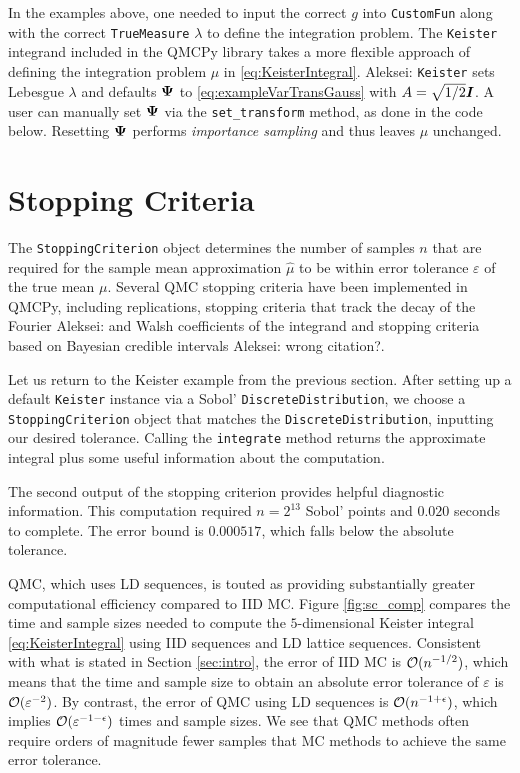 \documentclass[graybox,footinfo]{svmult}
\newcommand{\AGSComment}[1]{{\color{cyan} Aleksei: #1}}
\begin{document}
In the examples above, one needed to input the correct $g$ into \texttt{CustomFun} along with the correct \texttt{TrueMeasure} $\lambda$ to define the integration problem. The \texttt{Keister} integrand included in the QMCPy library takes a more flexible approach of defining the integration problem $\mu$ in \eqref{eq:KeisterIntegral}.
\AGSComment{\texttt{Keister} sets Lebesgue $\lambda$ and defaults ${\boldsymbol{\Psi}}$ to \eqref{eq:exampleVarTransGauss} with $A=\sqrt{1/2}{\boldsymbol{I}}$. A user can manually set ${\boldsymbol{\Psi}}$ via the \texttt{set\_transform} method, as done in the code below. Resetting ${\boldsymbol{\Psi}}$ performs  \emph{importance sampling} and thus leaves $\mu$ unchanged.}  


\section{Stopping Criteria} \label{sec:stopping_crit}

The \texttt{StoppingCriterion} object determines the number of samples $n$ that are required for the sample mean approximation $\hat{\mu}$ to be within error tolerance $\varepsilon$ of the true mean $\mu$.  Several QMC stopping criteria have been implemented in QMCPy, including replications, stopping criteria that track the decay of the Fourier \AGSComment{and Walsh} coefficients of the integrand \cite{HicJim16a,HicEtal17a,JimHic16a} and stopping criteria based on Bayesian credible intervals \cite{RatHic19a,JagHic22a} \AGSComment{wrong citation?}.

Let us return to the Keister example from the previous section.  After setting up  a default \texttt{Keister} instance via a Sobol' \texttt{DiscreteDistribution}, we choose a \texttt{StoppingCriterion} object that matches the \texttt{DiscreteDistribution}, inputting our desired tolerance.  Calling the  \texttt{integrate} method returns the approximate integral plus some useful information about the computation.

The second output of the stopping criterion provides helpful diagnostic information.  This computation required $n=2^{13}$ Sobol' points and $0.020$ seconds to complete.  The error bound is $0.000517$, which falls below the absolute tolerance.

QMC, which uses LD sequences, is touted as providing substantially greater computational efficiency compared to IID MC.
Figure \ref{fig:sc_comp} compares the time and sample sizes needed to compute the $5$-dimensional Keister integral \eqref{eq:KeisterIntegral} using IID sequences and LD lattice sequences. Consistent with what is stated in Section \ref{sec:intro}, the error of IID MC is ${\mathcal{O}}(n^{-1/2})$, which means that the time and sample size to obtain an absolute error tolerance of $\varepsilon$ is ${\mathcal{O}}(\varepsilon^{-2})$.  By contrast, the  error of QMC using LD sequences is ${\mathcal{O}}(n^{-1+\epsilon})$, which implies ${\mathcal{O}}(\varepsilon^{-1-\epsilon})$ times and sample sizes.  We see that QMC methods often require orders of magnitude fewer samples that MC methods to achieve the same error tolerance.
\end{document}
